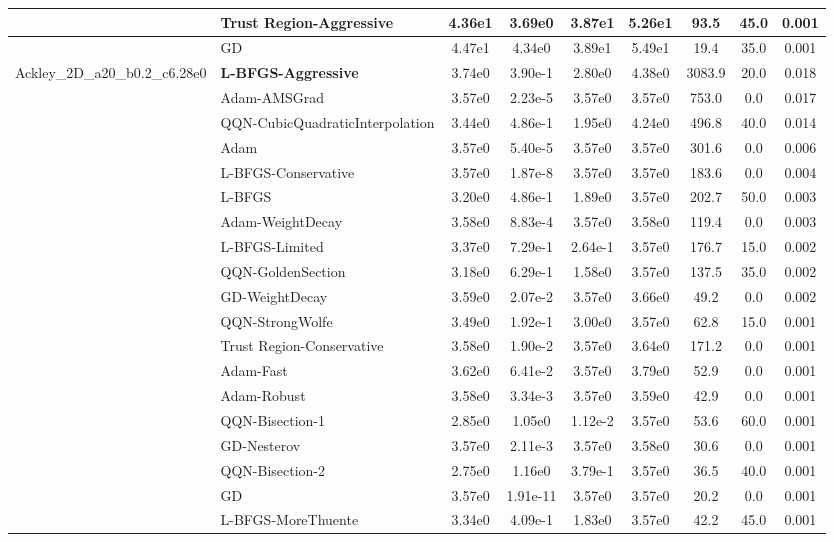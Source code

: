 \documentclass[10pt]{article}
\begin{document}
\begin{longtable}{|l|l|c|c|c|c|c|c|c|}
\hline
 & Trust Region-Aggressive & 4.36e1 & 3.69e0 & 3.87e1 & 5.26e1 & 93.5 & 45.0 & 0.001 \\
\hline
 & GD & 4.47e1 & 4.34e0 & 3.89e1 & 5.49e1 & 19.4 & 35.0 & 0.001 \\
Ackley\_2D\_a20\_b0.2\_c6.28e0 & \textbf{L-BFGS-Aggressive} & 3.74e0 & 3.90e-1 & 2.80e0 & 4.38e0 & 3083.9 & 20.0 & 0.018 \\
\hline
 & Adam-AMSGrad & 3.57e0 & 2.23e-5 & 3.57e0 & 3.57e0 & 753.0 & 0.0 & 0.017 \\
\hline
 & QQN-CubicQuadraticInterpolation & 3.44e0 & 4.86e-1 & 1.95e0 & 4.24e0 & 496.8 & 40.0 & 0.014 \\
\hline
 & Adam & 3.57e0 & 5.40e-5 & 3.57e0 & 3.57e0 & 301.6 & 0.0 & 0.006 \\
\hline
 & L-BFGS-Conservative & 3.57e0 & 1.87e-8 & 3.57e0 & 3.57e0 & 183.6 & 0.0 & 0.004 \\
\hline
 & L-BFGS & 3.20e0 & 4.86e-1 & 1.89e0 & 3.57e0 & 202.7 & 50.0 & 0.003 \\
\hline
 & Adam-WeightDecay & 3.58e0 & 8.83e-4 & 3.57e0 & 3.58e0 & 119.4 & 0.0 & 0.003 \\
\hline
 & L-BFGS-Limited & 3.37e0 & 7.29e-1 & 2.64e-1 & 3.57e0 & 176.7 & 15.0 & 0.002 \\
\hline
 & QQN-GoldenSection & 3.18e0 & 6.29e-1 & 1.58e0 & 3.57e0 & 137.5 & 35.0 & 0.002 \\
\hline
 & GD-WeightDecay & 3.59e0 & 2.07e-2 & 3.57e0 & 3.66e0 & 49.2 & 0.0 & 0.002 \\
\hline
 & QQN-StrongWolfe & 3.49e0 & 1.92e-1 & 3.00e0 & 3.57e0 & 62.8 & 15.0 & 0.001 \\
\hline
 & Trust Region-Conservative & 3.58e0 & 1.90e-2 & 3.57e0 & 3.64e0 & 171.2 & 0.0 & 0.001 \\
\hline
 & Adam-Fast & 3.62e0 & 6.41e-2 & 3.57e0 & 3.79e0 & 52.9 & 0.0 & 0.001 \\
\hline
 & Adam-Robust & 3.58e0 & 3.34e-3 & 3.57e0 & 3.59e0 & 42.9 & 0.0 & 0.001 \\
\hline
 & QQN-Bisection-1 & 2.85e0 & 1.05e0 & 1.12e-2 & 3.57e0 & 53.6 & 60.0 & 0.001 \\
\hline
 & GD-Nesterov & 3.57e0 & 2.11e-3 & 3.57e0 & 3.58e0 & 30.6 & 0.0 & 0.001 \\
\hline
 & QQN-Bisection-2 & 2.75e0 & 1.16e0 & 3.79e-1 & 3.57e0 & 36.5 & 40.0 & 0.001 \\
\hline
 & GD & 3.57e0 & 1.91e-11 & 3.57e0 & 3.57e0 & 20.2 & 0.0 & 0.001 \\
\hline
 & L-BFGS-MoreThuente & 3.34e0 & 4.09e-1 & 1.83e0 & 3.57e0 & 42.2 & 45.0 & 0.001 \\

\end{longtable}
\end{document}
